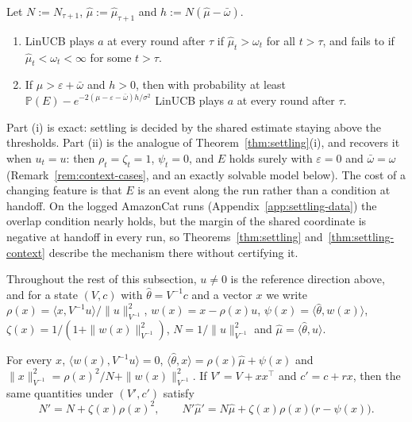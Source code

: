 \documentclass[anon]{alt2027} %
\newif\ifrevmarks\revmarkstrue
\newenvironment{revised}{\ifrevmarks\color{revcolor}\fi}{}
\newcommand{\rev}[1]{{\ifrevmarks\color{revcolor}\fi#1}}
\newcommand{\Prb}{\mathbb{P}}
\begin{document}
\begin{revised}
\begin{theorem}
\label{thm:settling-context}
Let $N:=N_{\tau+1}$, $\widehat\mu:=\widehat\mu_{\tau+1}$ and
$h:=N(\widehat\mu-\bar\omega)$.
\begin{enumerate}[itemsep=1pt,topsep=1pt,leftmargin=*]
\item[(i)] LinUCB plays $a$ at every round after $\tau$ if
$\widehat\mu_t>\omega_t$ for all $t>\tau$, and fails to if
$\widehat\mu_t<\omega_t<\infty$ for some $t>\tau$.
\item[(ii)] If $\mu>\varepsilon+\bar\omega$ and $h>0$, then with probability
at least $\Prb(E)-e^{-2(\mu-\varepsilon-\bar\omega)h/\sigma^2}$ LinUCB plays
$a$ at every round after $\tau$.
\end{enumerate}
\end{theorem}

Part (i) is exact: settling is decided by the shared estimate staying above
the thresholds. Part (ii) is the analogue of Theorem~\ref{thm:settling}(i),
and recovers it when $u_t=u$: then $\rho_t=\zeta_t=1$, $\psi_t=0$, and $E$
holds surely with $\varepsilon=0$ and $\bar\omega=\omega$
(Remark~\ref{rem:context-cases}, and an exactly solvable model below). The cost of a changing feature is that $E$ is an event along the run
rather than a condition at handoff. On the logged AmazonCat runs
(Appendix~\ref{app:settling-data}) the overlap condition nearly holds, but
the margin of the shared coordinate is negative at handoff in every run, so
Theorems~\ref{thm:settling} and~\ref{thm:settling-context} describe the
mechanism there without certifying it.
\end{revised}

\rev{Throughout the rest of this subsection,} $u\ne0$ is the reference direction \rev{above}, and for a state $(V,c)$ with
$\widehat\theta=V^{-1}c$ and a vector $x$ we write
$\rho(x)=\langle x,V^{-1}u\rangle/\|u\|^2_{V^{-1}}$, $w(x)=x-\rho(x)u$,
$\psi(x)=\langle\widehat\theta,w(x)\rangle$,
$\zeta(x)=1/(1+\|w(x)\|^2_{V^{-1}})$, $N=1/\|u\|^2_{V^{-1}}$ and
$\widehat\mu=\langle\widehat\theta,u\rangle$.

\begin{lemma}
\label{lem:shared}
For every $x$, $\langle w(x),V^{-1}u\rangle=0$,
$\langle\widehat\theta,x\rangle=\rho(x)\widehat\mu+\psi(x)$ and
$\|x\|^2_{V^{-1}}=\rho(x)^2/N+\|w(x)\|^2_{V^{-1}}$. If $V'=V+xx^\top$ and
$c'=c+rx$, then the same quantities under $(V',c')$ satisfy
\[
N'=N+\zeta(x)\rho(x)^2,\qquad
N'\widehat\mu'=N\widehat\mu+\zeta(x)\rho(x)\bigl(r-\psi(x)\bigr).
\]
\end{lemma}
\end{document}
